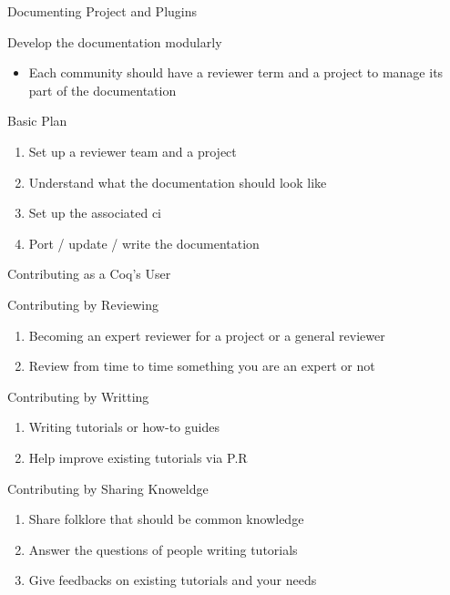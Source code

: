 \documentclass[10pt]{beamer}
\begin{document}
\begin{frame}{Documenting Project and Plugins}
  \begin{tcbProp}{Develop the documentation modularly}
    \begin{itemize}
      \item Each community should have a reviewer term and a project to manage
            its part of the documentation
    \end{itemize}
  \end{tcbProp}
  \begin{tcbProp}{Basic Plan}
    \begin{enumerate}
      \item Set up a reviewer team and a project
      \item Understand what the documentation should look like
      \item Set up the associated ci
      \item Port / update / write the documentation
    \end{enumerate}
  \end{tcbProp}
\end{frame}

\begin{frame}{Contributing as a Coq's User}
  \begin{tcbProp}{Contributing by Reviewing}
    \begin{enumerate}
      \item Becoming an expert reviewer for a project or a general reviewer
      \item Review from time to time something you are an expert or not
    \end{enumerate}
  \end{tcbProp}
  \begin{tcbProp}{Contributing by Writting}
    \begin{enumerate}
      \item Writing tutorials or how-to guides
      \item Help improve existing tutorials via P.R
    \end{enumerate}
  \end{tcbProp}
  \begin{tcbProp}{Contributing by Sharing Knoweldge}
    \begin{enumerate}
      \item Share folklore that should be common knowledge
      \item Answer the questions of people writing tutorials
      \item Give feedbacks on existing tutorials and your needs
    \end{enumerate}
  \end{tcbProp}
\end{frame}
\end{document}

